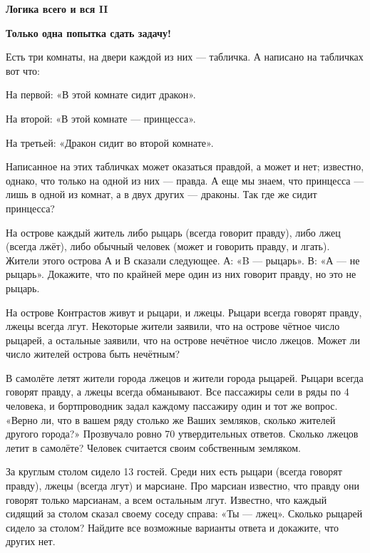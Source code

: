 \centerline{\bf \Huge Логика всего и вся II}

\begin{flushright}
        \scriptsize{\textbf{Только одна попытка сдать задачу!}}
\end{flushright}

Есть три комнаты, на двери каждой из них — табличка. А написано на табличках вот что:

На первой: «В этой комнате сидит дракон».

На второй: «В этой комнате — принцесса».

На третьей: «Дракон сидит во второй комнате».

Написанное на этих табличках может оказаться правдой, а может и нет; известно, однако, что только на одной из них — правда. А еще мы знаем, что принцесса — лишь в одной из комнат, а в двух других — драконы. Так где же сидит принцесса?


 На острове каждый житель либо рыцарь (всегда говорит правду), либо
лжец (всегда лжёт), либо обычный человек (может и говорить правду, и лгать). Жители этого
острова А и В сказали следующее. А: «B — рыцарь». В: «А — не рыцарь». Докажите, что по
крайней мере один из них говорит правду, но это не рыцарь.



 На острове Контрастов живут и рыцари, и лжецы.
Рыцари всегда говорят правду, лжецы всегда лгут. Некоторые жители заявили, что на острове
чётное число рыцарей, а остальные заявили, что на острове нечётное число лжецов. Может ли
число жителей острова быть нечётным?


  В самолёте летят жители города лжецов и жители города рыцарей. Рыцари всегда говорят правду, а лжецы всегда обманывают. Все пассажиры сели
в ряды по 4 человека, и бортпроводник задал каждому пассажиру один и тот же вопрос. «Верно
ли, что в вашем ряду столько же Ваших земляков, сколько жителей другого города?» Прозвучало ровно 70 утвердительных ответов. Сколько лжецов летит в самолёте? Человек считается
своим собственным земляком.


 За круглым столом сидело 13 гостей. Среди них есть рыцари
(всегда говорят правду), лжецы (всегда лгут) и марсиане. Про марсиан известно, что правду они
говорят только марсианам, а всем остальным лгут. Известно, что каждый сидящий за столом
сказал своему соседу справа: «Ты — лжец». Сколько рыцарей сидело за столом? Найдите все
возможные варианты ответа и докажите, что других нет.




